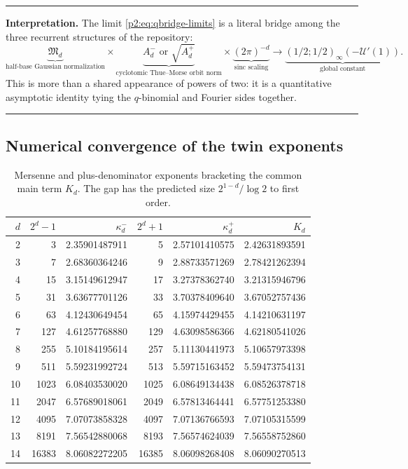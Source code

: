 \documentclass[11pt,oneside]{article}
\theoremstyle{definition}
\theoremstyle{remark}
\newenvironment{boxedremark}{\par\smallskip\noindent\begin{center}\begin{minipage}{0.94\textwidth}\hrule\vspace{0.6em}\small}{\vspace{0.6em}\hrule\end{minipage}\end{center}\smallskip}
\begin{document}
\begin{boxedremark}
\textbf{Interpretation.} The limit \eqref{p2:eq:qbridge-limits} is a literal bridge
among the three recurrent structures of the repository:
\[
 \underbrace{\mathfrak M_d}_{\text{half-base Gaussian normalization}}
 \times
 \underbrace{A_d^-\text{ or }\sqrt{A_d^+}}_{\text{cyclotomic Thue--Morse orbit norm}}
 \times
 \underbrace{(2\pi)^{-d}}_{\text{sinc scaling}}
 \longrightarrow
 \underbrace{(1/2;1/2)_\infty(-\mathscr U'(1))}_{\text{global constant}}.
\]
This is more than a shared appearance of powers of two: it is a quantitative
asymptotic identity tying the $q$-binomial and Fourier sides together.
\end{boxedremark}

\subsection{Numerical convergence of the twin exponents}

\begin{table}[ht]
\centering\small
\begin{tabular}{rrrrrr}
\toprule
$d$ & $2^d-1$ & $\kappa_d^-$ & $2^d+1$ & $\kappa_d^+$ & $K_d$ \\
\midrule
2  & 3     & 2.35901487911 & 5     & 2.57101410575 & 2.42631893591 \\
3  & 7     & 2.68360364246 & 9     & 2.88733571269 & 2.78421262394 \\
4  & 15    & 3.15149612947 & 17    & 3.27378362740 & 3.21315946796 \\
5  & 31    & 3.63677701126 & 33    & 3.70378409640 & 3.67052757436 \\
6  & 63    & 4.12430649454 & 65    & 4.15974429455 & 4.14210631197 \\
7  & 127   & 4.61257768880 & 129   & 4.63098586366 & 4.62180541026 \\
8  & 255   & 5.10184195614 & 257   & 5.11130441973 & 5.10657973398 \\
9  & 511   & 5.59231992724 & 513   & 5.59715163452 & 5.59473754131 \\
10 & 1023  & 6.08403530020 & 1025  & 6.08649134438 & 6.08526378718 \\
11 & 2047  & 6.57689018061 & 2049  & 6.57813464441 & 6.57751253380 \\
12 & 4095  & 7.07073858328 & 4097  & 7.07136766593 & 7.07105315599 \\
13 & 8191  & 7.56542880068 & 8193  & 7.56574624039 & 7.56558752860 \\
14 & 16383 & 8.06082272205 & 16385 & 8.06098268408 & 8.06090270513 \\
\bottomrule
\end{tabular}
\caption{Mersenne and plus-denominator exponents bracketing the common main term
$K_d$. The gap has the predicted size $2^{1-d}/\log2$ to first order.}
\label{p2:tab:pm-kappa}
\end{table}
\end{document}
